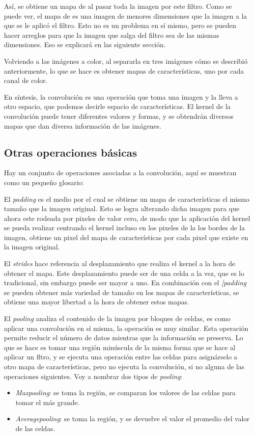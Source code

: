 \documentclass[14pt,a4paper]{report}
\begin{document}
Así, se obtiene un mapa de  al pasar toda la imagen por este filtro. Como se puede ver, el mapa de  es una imagen de menores dimensiones que la imagen a la que se le aplicó el filtro. Esto no es un problema en sí mismo, pero se pueden hacer arreglos para que la imagen que salga del filtro sea de las mismas dimensiones. Eso se explicará en las siguiente sección.

Volviendo a las imágenes a color, al separarla en tres imágenes cómo se describió anteriormente, lo que se hace es obtener mapas de características, uno por cada canal de color.

En síntesis, la convolución es una operación que toma una imagen y la lleva a otro espacio, que podemos decirle espacio de características. El kernel de la convolución puede tener diferentes valores y formas, y se obtendrán diversos mapas que dan diversa información de las imágenes.

\subsection*{Otras operaciones básicas}
Hay un conjunto de operaciones asociadas a la convolución, aquí se muestran como un pequeño glosario:

El \textit{padding} es el medio por el cual se obtiene un mapa de características el mismo tamaño que la imagen original. Esto se logra alterando dicha imagen para que ahora este rodeada por pixeles de valor cero, de modo que la aplicación del kernel se pueda realizar centrando el kernel incluso en los pixeles de la los bordes de la imagen, obtiene un pixel del mapa de características por cada pixel que existe en la imagen original.

El \textit{strides} hace referencia al desplazamiento que realiza el kernel a la hora de obtener el mapa. Este desplazamiento puede ser de una celda a la vez, que es lo tradicional, sin embargo puede ser mayor a uno. En combinación con el \textit{[padding} se pueden obtener más variedad de tamaño en los mapas de características, se obtiene una mayor libertad a la hora de obtener estos mapas.

El \textit{pooling} analiza el contenido de la imagen por bloques de celdas, es como aplicar una convolución en sí misma, la operación es muy similar. Esta operación permite reducir el número de datos mientras que la información se preserva. Lo que se hace es tomar una región minúscula de la misma forma que se hace al aplicar un fltro, y se ejecuta una operación entre las celdas para asignárselo a otro mapa de características, pero no ejecuta la convolución, si no alguna de las operaciones siguientes. Voy a nombrar dos tipos de \textit{pooling}:\\
\begin{itemize}
\item \textit{Maxpooling}: se toma la región, se comparan los valores de las celdas para tomar el más grande.
\item \textit{Averagepooling}: se toma la región, y se devuelve el valor el promedio del valor de las celdas.
\end{itemize}
\end{document}
